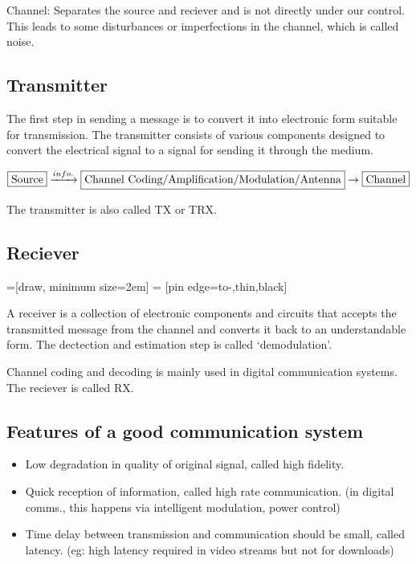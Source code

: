 \documentclass{article}
\begin{document}
Channel: Separates the source and reciever and is not directly under our control.
This leads to some disturbances or imperfections in the channel, which is called noise.

\subsection{Transmitter}
The first step in sending a message is to convert it into electronic form suitable for transmission. The transmitter consists of various components designed to convert the electrical signal to a signal for sending it through the medium.

$$\fbox{Source} \xrightarrow{info.} \fbox{Channel Coding/Amplification/Modulation/Antenna} \rightarrow \fbox {Channel} $$

The transmitter is also called TX or TRX.

\subsection{Reciever}

=[draw, minimum size=2em]
 = [pin edge={to-,thin,black}]
\newline
A receiver is a collection of electronic components and circuits that accepts the transmitted message from the channel and converts it back to an understandable form.
The dectection and estimation step is called `demodulation'.

Channel coding and decoding is mainly used in digital communication systems. The reciever is called RX.

\subsection{Features of a good communication system}
\begin{itemize}
    \item Low degradation in quality of original signal, called high fidelity.
    \item Quick reception of information, called high rate communication.
        (in digital comms., this happens via intelligent modulation, power control)
    \item Time delay between transmission and communication should be small, called latency. (eg: high latency required in video streams but not for downloads)
\end{itemize}
\end{document}
